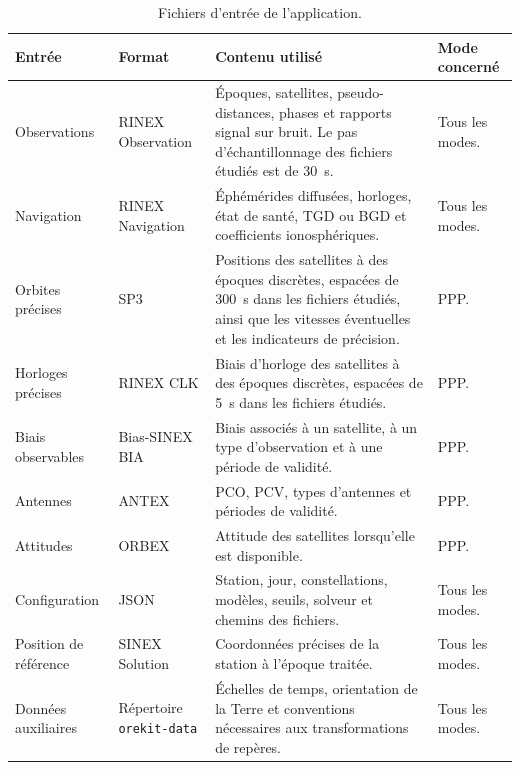 \begin{table}[htbp]
\centering
\small
\begin{tabularx}{\textwidth}{|>{\raggedright\arraybackslash}p{}|
                                  >{\raggedright\arraybackslash}p{}|
                                  >{\raggedright\arraybackslash}X|
                                  >{\raggedright\arraybackslash}p{}|}
\hline
\textbf{Entrée} & \textbf{Format} & \textbf{Contenu utilisé} &
\textbf{Mode concerné} \\
\hline
Observations & RINEX Observation & Époques,
satellites, pseudo-distances, phases et rapports signal sur bruit. Le pas
d'échantillonnage des fichiers étudiés est de 30~s. & Tous les modes. \\
\hline
Navigation & RINEX Navigation & Éphémérides diffusées, horloges, état de santé,
TGD ou BGD et coefficients ionosphériques. & Tous les modes. \\
\hline
Orbites précises & SP3 & Positions des satellites à des époques discrètes,
espacées de 300~s dans les fichiers étudiés, ainsi que les vitesses éventuelles
et les indicateurs de précision. & PPP. \\
\hline
Horloges précises & RINEX CLK & Biais d'horloge des satellites à des époques
discrètes, espacées de 5~s dans les fichiers étudiés. & PPP. \\
\hline
Biais observables & Bias-SINEX BIA & Biais associés à un satellite, à un type
d'observation et à une période de validité. & PPP. \\
\hline
Antennes & ANTEX & PCO, PCV, types d'antennes et périodes de validité. & PPP. \\
\hline
Attitudes & ORBEX & Attitude des satellites lorsqu'elle est disponible. & PPP. \\
\hline
Configuration & JSON & Station, jour, constellations, modèles, seuils,
solveur et chemins des fichiers. & Tous les modes. \\
\hline
Position de référence & SINEX Solution & Coordonnées précises de la station à
l'époque traitée. & Tous les modes. \\
\hline
Données auxiliaires & Répertoire \texttt{orekit-data} & Échelles de temps,
orientation de la Terre et conventions nécessaires aux transformations de
repères. & Tous les modes. \\
\hline
\end{tabularx}
\caption{Fichiers d'entrée de l'application.}
\label{tab:implementation_input_files}
\end{table}

